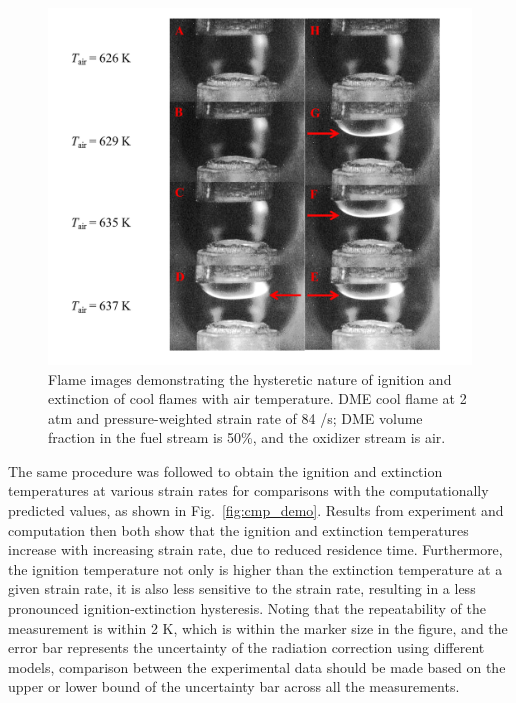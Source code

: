 \begin{figure}[t]
  \centering
  \scriptsize
  \includegraphics[width=1.0\textwidth]{ch-NTC/UV.png}
  \normalsize
  \caption{Flame images demonstrating the hysteretic nature of ignition and extinction of cool flames with air temperature. DME cool flame at 2 atm and pressure-weighted strain rate of 84 /s; DME volume fraction in the fuel stream is 50\%, and the oxidizer stream is air.}
  \label{fig:UV}
\end{figure}

The same procedure was followed to obtain the ignition and extinction temperatures at various strain rates for comparisons with the computationally predicted values, as shown in Fig.~\ref{fig:cmp_demo}.  Results from experiment and computation then both show that the ignition and extinction temperatures increase with increasing strain rate, due to reduced residence time.  Furthermore, the ignition temperature not only is higher than the extinction temperature at a given strain rate, it is also less sensitive to the strain rate, resulting in a less pronounced ignition-extinction hysteresis. Noting that the repeatability of the measurement is within 2 K, which is within the marker size in the figure, and the error bar represents the uncertainty of the radiation correction using different models, comparison between the experimental data should be made based on the upper or lower bound of the uncertainty bar across all the measurements.

